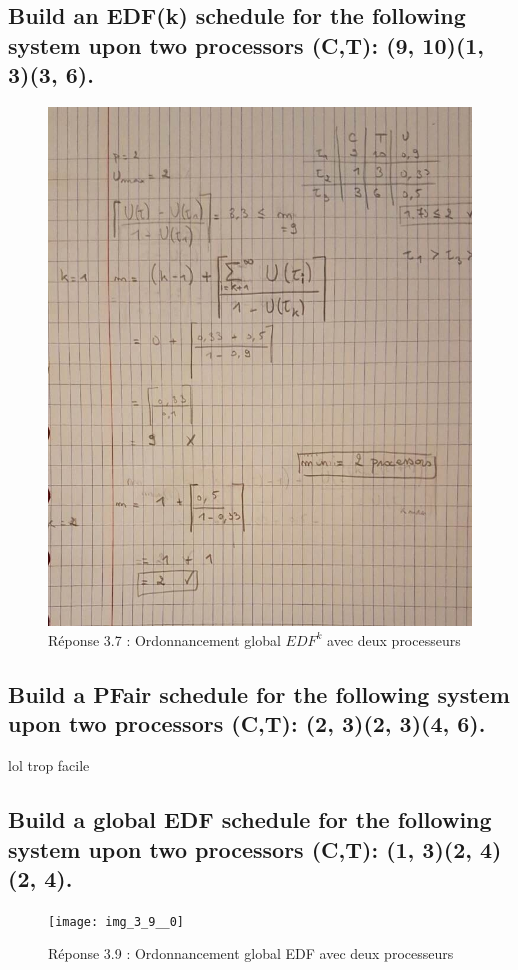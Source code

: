 \subsection{Build an EDF(k) schedule for the following system upon two processors (C,T): (9, 10)(1, 3)(3, 6).}
\begin{figure}[H]
	\centering
	\includegraphics[scale=0.7]{img_3_7__0}
    \caption{Réponse 3.7 : Ordonnancement global $EDF^{k}$ avec deux processeurs}
\end{figure}

\subsection{Build a PFair schedule for the following system upon two processors (C,T): (2, 3)(2, 3)(4, 6).}
lol trop facile
\subsection{Build a global EDF schedule for the following system upon two processors (C,T): (1, 3)(2, 4)(2, 4).}
   \begin{figure}[H]
      \centering
      \texttt{[image: img\_3\_9\_\_0]}
      \caption{Réponse 3.9 : Ordonnancement global EDF avec deux processeurs}
   \end{figure}
